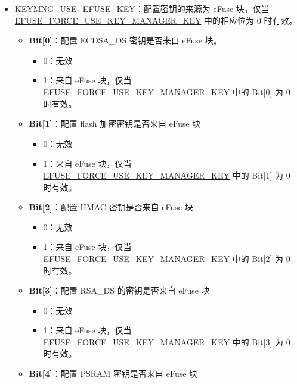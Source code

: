 \documentclass[main\_\_CN.tex]{subfiles}
\begin{document}
\begin{enumerate}
\begin{itemize}
\begin{itemize}
        \end{itemize}
        \item \hyperref[fielddesc:KEYMNGUSEEFUSEKEY]{KEYMNG\_USE\_EFUSE\_KEY}：配置密钥的来源为 eFuse 块，仅当 \hyperref[fielddesc:EFUSEFORCEUSEKEYMANAGERKEY]{EFUSE\_FORCE\_USE\_KEY\_MANAGER\_KEY} 中的相应位为 0 时有效。
        \begin{itemize}
            \item \textbf{Bit[0]}：配置 ECDSA\_DS 密钥是否来自 eFuse 块。
            \begin{itemize}
                \item 0：无效
                \item 1：来自 eFuse 块，仅当 \hyperref[fielddesc:EFUSEFORCEUSEKEYMANAGERKEY]{EFUSE\_FORCE\_USE\_KEY\_MANAGER\_KEY} 中的 Bit[0] 为 0 时有效。
            \end{itemize}
            \item \textbf{Bit[1]}：配置 flash 加密密钥是否来自 eFuse 块
            \begin{itemize}
                \item 0：无效
                \item 1：来自 eFuse 块，仅当 \hyperref[fielddesc:EFUSEFORCEUSEKEYMANAGERKEY]{EFUSE\_FORCE\_USE\_KEY\_MANAGER\_KEY} 中的 Bit[1] 为 0 时有效。
            \end{itemize}
            \item \textbf{Bit[2]}：配置 HMAC 密钥是否来自 eFuse 块
            \begin{itemize}
                \item 0：无效
                \item 1：来自 eFuse 块，仅当 \hyperref[fielddesc:EFUSEFORCEUSEKEYMANAGERKEY]{EFUSE\_FORCE\_USE\_KEY\_MANAGER\_KEY} 中的 Bit[2] 为 0 时有效。
            \end{itemize}
            \item \textbf{Bit[3]}：配置 RSA\_DS 的密钥是否来自 eFuse 块
            \begin{itemize}
                \item 0：无效
                \item 1：来自 eFuse 块，仅当 \hyperref[fielddesc:EFUSEFORCEUSEKEYMANAGERKEY]{EFUSE\_FORCE\_USE\_KEY\_MANAGER\_KEY} 中的 Bit[3] 为 0 时有效。
            \end{itemize}
            \item \textbf{Bit[4]}：配置 PSRAM 密钥是否来自 eFuse 块
            \begin{itemize}

\end{itemize}
\end{itemize}
\end{itemize}
\end{enumerate}
\end{document}

